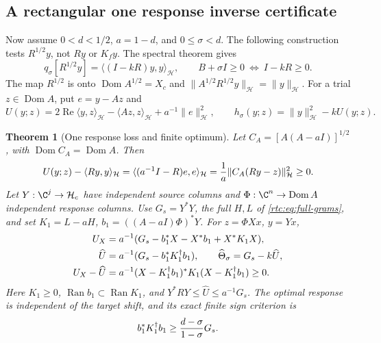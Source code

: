 \documentclass[11pt,a4paper]{article}
\numberwithin{equation}{section}
\newtheorem{theorem}{Theorem}[section]
\theoremstyle{definition}\newtheorem{definition}[theorem]{Definition}
\theoremstyle{remark}\newtheorem{remark}[theorem]{Remark}
\newcommand{\Hh}{\mathcal H}\newcommand{\Hw}{\mathcal H}
\newcommand{\ip}[2]{\langle#1,#2\rangle}\newcommand{\norm}[1]{\lVert#1\rVert}\newcommand{\abs}[1]{\lvert#1\rvert}
\begin{document}
\subsection{A rectangular one response inverse certificate}\label{rtc:sec:single}
Now assume $0<d<1/2$, $a=1-d$, and $0\le\sigma<d$.
The following construction tests $R^{1/2}y$, not $Ry$ or $K_fy$.
The spectral theorem gives
\begin{equation}\label{rtc:eq:inverse-target}
 q_\sigma[R^{1/2}y]=\ip{(I-kR)y}{y}_{\Hh},\qquad
 B+\sigma I\ge0\ \Longleftrightarrow\ I-kR\ge0.
\end{equation}
The map $R^{1/2}$ is onto $\operatorname{Dom}A^{1/2}=X_c$ and
$\norm{A^{1/2}R^{1/2}y}_{\Hh}=\norm y_{\Hh}$.
For a trial $z\in\operatorname{Dom}A$, put $e=y-Az$ and
\begin{equation}\label{rtc:eq:single-upper}
 U(y;z)=2\operatorname{Re}\ip y z_{\Hh}-\ip{Az}z_{\Hh}
                      +a^{-1}\norm e_{\Hh}^2,
 \qquad h_\sigma(y;z)=\norm y_{\Hh}^2-kU(y;z).
\end{equation}
\begin{theorem}[One response loss and finite optimum]\label{rtc:thm:single}
Let $C_A=[A(A-aI)]^{1/2}$, with
$\operatorname{Dom}C_A=\operatorname{Dom}A$. Then
\begin{equation}\label{rtc:eq:single-loss}
 U(y;z)-\ip{Ry}y_{\Hh}
 =\ip{(a^{-1}I-R)e}e_{\Hh}
 ={1\over a}\norm{C_A(Ry-z)}_{\Hh}^2\ge0.
\end{equation}
Let $Y:\C^j\to\Hh_c$ have independent source columns and
$\Phi:\C^n\to\operatorname{Dom}A$ independent response columns.
Use $G_s=Y^*Y$, the full $H,L$ of \eqref{rtc:eq:full-grams}, and set
$K_1=L-aH$, $b_1=((A-aI)\Phi)^*Y$. For $z=\Phi Xx$, $y=Yx$,
\begin{align}\label{rtc:eq:single-finite}
 U_X&=a^{-1}(G_s-b_1^*X-X^*b_1+X^*K_1X),\notag\\
 \widehat U&=a^{-1}(G_s-b_1^*K_1^\dagger b_1),\qquad
 \widehat\Theta_\sigma=G_s-k\widehat U,\\
 U_X-\widehat U&=a^{-1}(X-K_1^\dagger b_1)^*K_1
                            (X-K_1^\dagger b_1)\ge0.\notag
\end{align}
Here $K_1\ge0$, $\operatorname{Ran}b_1\subset\operatorname{Ran}K_1$,
and $Y^*RY\le\widehat U\le a^{-1}G_s$.
The optimal response is independent of the target shift, and its exact
finite sign criterion is
\begin{equation}\label{rtc:eq:single-payment}
 b_1^*K_1^\dagger b_1\ge{d-\sigma\over1-\sigma}G_s.
\end{equation}
\end{theorem}
\end{document}
